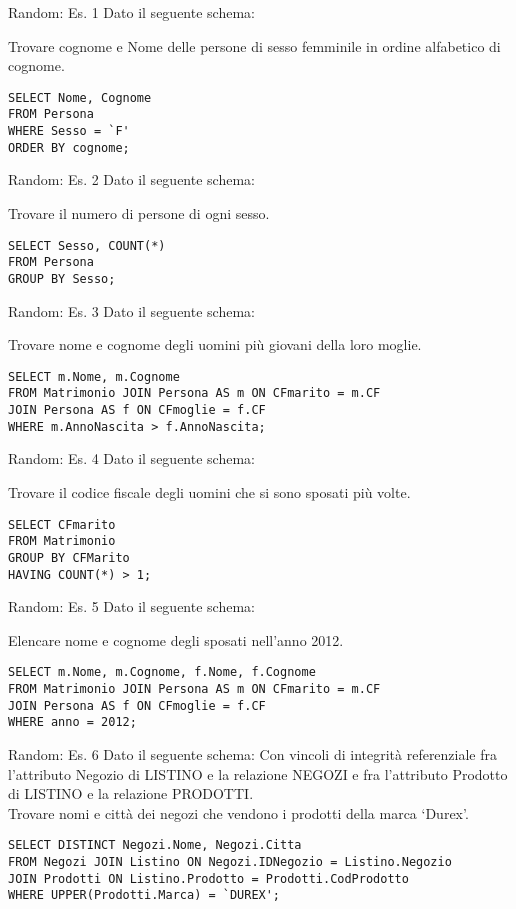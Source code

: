 \begin{frame}[fragile]{Random: Es. 1}
Dato il seguente schema:
\schemaPersonaMatrimonio

Trovare cognome e Nome delle persone di sesso femminile in ordine alfabetico di cognome.
\pause
\begin{lstlisting}
SELECT Nome, Cognome
FROM Persona
WHERE Sesso = `F'
ORDER BY cognome;
\end{lstlisting}
\end{frame}
%
\begin{frame}[fragile]{Random: Es. 2}
Dato il seguente schema:
\schemaPersonaMatrimonio

Trovare il numero di persone di ogni sesso.
\pause
\begin{lstlisting}
SELECT Sesso, COUNT(*)
FROM Persona
GROUP BY Sesso;
\end{lstlisting}
\end{frame}
%
\begin{frame}[fragile]{Random: Es. 3}
Dato il seguente schema:
\schemaPersonaMatrimonio

Trovare nome e cognome degli uomini pi\`u giovani della loro moglie.
\pause
\begin{lstlisting}
SELECT m.Nome, m.Cognome
FROM Matrimonio JOIN Persona AS m ON CFmarito = m.CF
JOIN Persona AS f ON CFmoglie = f.CF
WHERE m.AnnoNascita > f.AnnoNascita;
\end{lstlisting}
\end{frame}
%
\begin{frame}[fragile]{Random: Es. 4}
Dato il seguente schema:
\schemaPersonaMatrimonio

Trovare il codice fiscale degli uomini che si sono sposati pi\`u volte.
\pause
\begin{lstlisting}
SELECT CFmarito
FROM Matrimonio
GROUP BY CFMarito
HAVING COUNT(*) > 1;
\end{lstlisting}
\end{frame}
%
\begin{frame}[fragile]{Random: Es. 5}
Dato il seguente schema:
\schemaPersonaMatrimonio

Elencare nome e cognome degli sposati nell'anno 2012.
\pause
\begin{lstlisting}
SELECT m.Nome, m.Cognome, f.Nome, f.Cognome
FROM Matrimonio JOIN Persona AS m ON CFmarito = m.CF
JOIN Persona AS f ON CFmoglie = f.CF
WHERE anno = 2012;
\end{lstlisting}
\end{frame}
%
\begin{frame}[fragile]{Random: Es. 6}
Dato il seguente schema:
\schemaNegoziProdottiListino
Con vincoli di integrit\`a referenziale fra l'attributo Negozio di LISTINO e la relazione NEGOZI e fra l'attributo Prodotto di LISTINO e la relazione PRODOTTI.
\newline
\\Trovare nomi e citt\`a dei negozi che vendono i prodotti della marca `Durex'.
\pause
\begin{lstlisting}
SELECT DISTINCT Negozi.Nome, Negozi.Citta
FROM Negozi JOIN Listino ON Negozi.IDNegozio = Listino.Negozio
JOIN Prodotti ON Listino.Prodotto = Prodotti.CodProdotto
WHERE UPPER(Prodotti.Marca) = `DUREX';
\end{lstlisting}
\end{frame}
